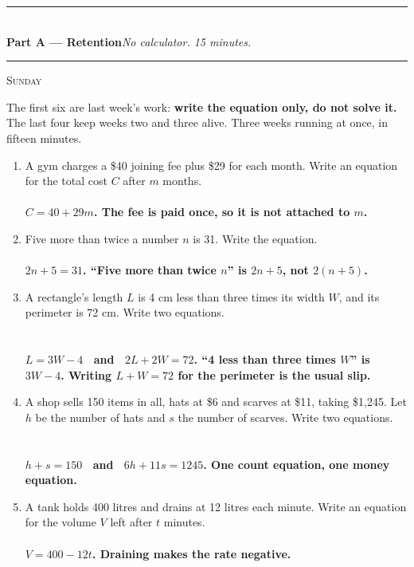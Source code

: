 \documentclass[11pt,a4paper]{article}
\newif\ifANSWERS
\newcommand{\PartHead}[2]{%
  \vspace{6pt}
  {\color{navy}\rule{\textwidth}{0.8pt}}\\[2pt]
  {\large\bfseries\color{navy}#1}\hfill{\small\itshape #2}\\[-4pt]
  {\color{navy}\rule{\textwidth}{0.4pt}}
  \vspace{4pt}
}
\newcommand{\sitting}[1]{{\footnotesize\textsc{\color{navy}#1}}\par\vspace{2pt}}
\newcommand{\ans}[1]{\ {\color{keyred}\bfseries #1}}
\newcommand{\ans}[1]{}
\begin{document}
\PartHead{Part A --- Retention}{No calculator. 15 minutes.}
\sitting{Sunday}
The first six are last week's work: \textbf{write the equation only, do not solve it.}
The last four keep weeks two and three alive. Three weeks running at once, in fifteen minutes.

\begin{enumerate}[leftmargin=20pt,itemsep=7pt]
\item A gym charges a \$40 joining fee plus \$29 for each month. Write an equation for the total cost $C$ after $m$ months.\ifANSWERS\else\\
  \underline{\hspace{\linewidth}}\fi
  \ans{\\ $C=40+29m$. The fee is paid once, so it is not attached to $m$.}

\item Five more than twice a number $n$ is 31. Write the equation.\ifANSWERS\else\\
  \underline{\hspace{\linewidth}}\fi
  \ans{\\ $2n+5=31$. ``Five more than twice $n$'' is $2n+5$, not $2(n+5)$.}

\item A rectangle's length $L$ is 4 cm less than three times its width $W$, and its perimeter is 72 cm. Write two equations.\ifANSWERS\else\\
  \underline{\hspace{\linewidth}}\\[4pt]
  \underline{\hspace{\linewidth}}\fi
  \ans{\\ $L=3W-4$ \ and \ $2L+2W=72$. ``4 less than three times $W$'' is $3W-4$. Writing $L+W=72$ for the perimeter is the usual slip.}

\item A shop sells 150 items in all, hats at \$6 and scarves at \$11, taking \$1{,}245. Let $h$ be the number of hats and $s$ the number of scarves. Write two equations.\ifANSWERS\else\\
  \underline{\hspace{\linewidth}}\\[4pt]
  \underline{\hspace{\linewidth}}\fi
  \ans{\\ $h+s=150$ \ and \ $6h+11s=1245$. One count equation, one money equation.}

\item A tank holds 400 litres and drains at 12 litres each minute. Write an equation for the volume $V$ left after $t$ minutes.\ifANSWERS\else\\
  \underline{\hspace{\linewidth}}\fi
  \ans{\\ $V=400-12t$. Draining makes the rate negative.}


\end{enumerate}
\end{document}
